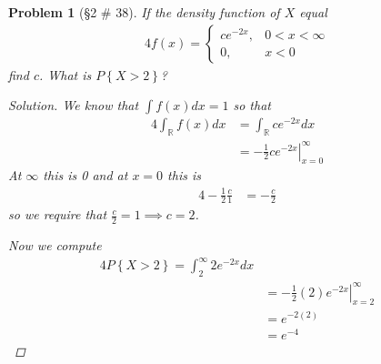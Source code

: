 \documentclass[11pt, oneside]{book}   	%
\newtheorem{problem}{Problem}[chapter]
\newcommand{\set}[1]{\left\{#1\right\}}
\begin{document}
\begin{problem}[\S 2 \# 38]
	If the density function of $X$ equal 
	\begin{alignat}{4}
		f(x)=\left\{\begin{array}{ll}
			ce^{-2x},&0<x<\infty \\
			0,&x<0
			\end{array}\right.
	\end{alignat}
	find $c$. What is $P\set{X>2}$? 
	\begin{proof}[Solution]
		We know that $\int f(x)dx = 1$ so that 
		\begin{alignat}{4}
			\int_\mathbb{R}f(x)dx &= \int_\mathbb{R} ce^{-2x} dx \\
				&=\left.-\frac{1}{2}ce^{-2x}\right|_{x=0}^\infty
		\end{alignat}
		At $\infty$ this is 0 and at $x=0$ this is 
		\begin{alignat}{4}
			-\frac{1}{2}\frac{c}{1}&=-\frac{c}{2}
		\end{alignat}
		so we require that $\frac{c}{2}=1\implies c=2$. 
		
		Now we compute
		\begin{alignat}{4}
			P\set{X>2}=\int_2^\infty 2e^{-2x}dx \\
				&=\left.-\frac{1}{2}(2)e^{-2x}\right|_{x=2}^\infty \\
				&=e^{-2(2)} \\
				&=e^{-4}
		\end{alignat}
	\end{proof}
\end{problem}
\end{document}

